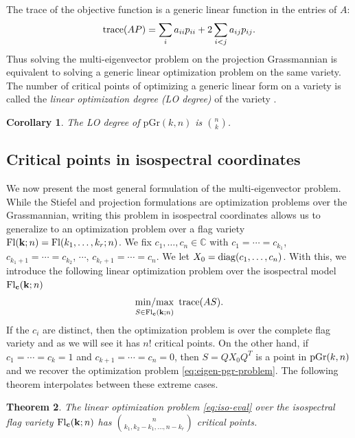 \documentclass[12pt]{extarticle}
\newtheorem{theorem}{Theorem}
\newtheorem{corollary}[theorem]{Corollary}
\theoremstyle{definition}
\numberwithin{theorem}{section}
\newcommand{\CC}{\mathbb{C}}
\newcommand{\minmax}{\mathop{{\rm min/max}}}
\begin{document}
The trace of the objective function is a generic linear function in the entries of $A$:
\begin{align*}
    {\rm trace}(AP) = \sum_i a_{ii} p_{ii} + 2\sum_{i < j} a_{ij}p_{ij}.
\end{align*}
Thus solving the multi-eigenvector problem on the projection Grassmannian is equivalent to solving a generic linear optimization problem on the same variety. 
The number of critical points of optimizing a generic linear form on a variety is called the \emph{linear optimization degree (LO degree)} of the variety \cite{MRWW}.
\begin{corollary}\label{cor:grassLO}
    The LO degree of $\mathrm{pGr}(k,n)$ is $\binom{n}{k}$.
\end{corollary}
\subsection{Critical points in isospectral coordinates}
We now present the most general formulation of the multi-eigenvector problem. 
While the Stiefel and projection formulations are optimization problems over the Grassmannian, writing this problem in isospectral coordinates allows us to generalize to an optimization problem over a flag variety ${\rm Fl}({\bf k}; n) = {\rm Fl}(k_1, \ldots, k_r; n)$. 
We fix $c_1, \ldots, c_n \in \CC$ with $c_1 = \cdots = c_{k_1}$, $c_{k_1+1} = \cdots = c_{k_2}$, $\cdots$, $c_{k_r+1} = \cdots = c_n$. We let $X_0 = {\rm diag}(c_1, \ldots, c_n)$. With this, we introduce the following  linear optimization problem over the isospectral model ${\rm Fl}_{\bf c}({\bf k};n)$
\begin{align}\label{eq:iso-eval}
    \minmax_{S \in {\rm Fl}_{\bf c}({\bf k}; n)} \,\, {\rm trace}(AS).
\end{align}
If the $c_i$ are distinct, then the optimization problem is over the complete flag variety and as we will see it has $n!$ critical points. 
On the other hand, if $c_1 = \cdots = c_k = 1$ and $c_{k+1} = \cdots = c_n = 0$, then $S = Q X_0 Q^T$ is a point in ${\rm pGr}(k,n)$ and we recover the optimization problem \eqref{eq:eigen-pgr-problem}.
The following theorem interpolates between these extreme cases. 

\begin{theorem}\label{thm:eigen-iso-degree}
  The linear optimization problem \eqref{eq:iso-eval} over the isospectral flag variety ${\rm Fl}_{\bf c}({\bf k};n)$ has $\binom{n}{k_1, k_2-k_1, \ldots, n-k_r}$ critical points.
\end{theorem}
\end{document}
